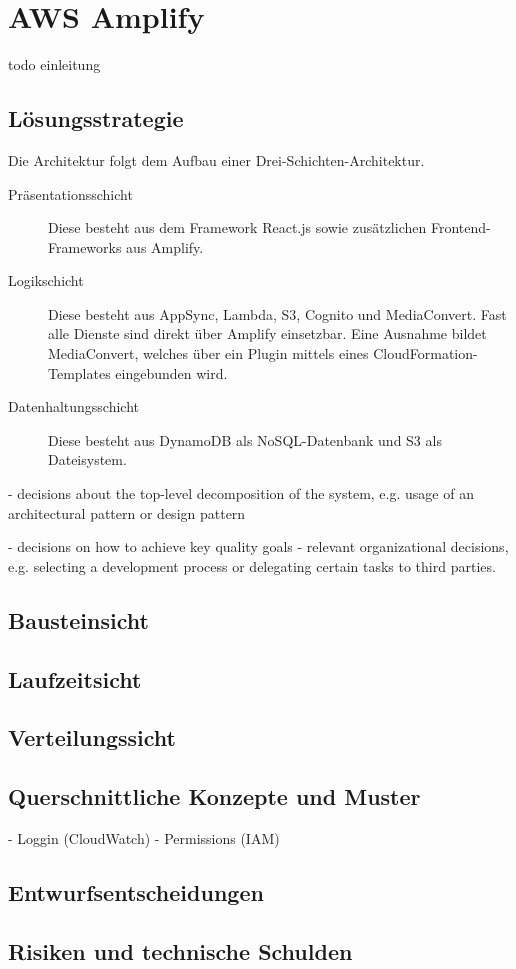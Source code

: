 \section{AWS Amplify}

todo einleitung

\subsection{Lösungsstrategie}

Die Architektur folgt dem Aufbau einer Drei-Schichten-Architektur.

\begin{description}
   \item[Präsentationsschicht] Diese besteht aus dem Framework React.js sowie zusätzlichen Frontend-Frameworks aus Amplify.
   \item[Logikschicht] Diese besteht aus AppSync, Lambda, S3, Cognito und MediaConvert. Fast alle Dienste sind direkt über Amplify einsetzbar. Eine Ausnahme bildet MediaConvert, welches über ein Plugin mittels eines CloudFormation-Templates eingebunden wird.
   \item[Datenhaltungsschicht] Diese besteht aus DynamoDB als NoSQL-Datenbank und S3 als Dateisystem.
\end{description}

- decisions about the top-level decomposition of the system, e.g. usage of an architectural pattern or design pattern


- decisions on how to achieve key quality goals
- relevant organizational decisions, e.g. selecting a development process or delegating certain tasks to third parties.

\subsection{Bausteinsicht}

\subsection{Laufzeitsicht}

\subsection{Verteilungssicht}

\subsection{Querschnittliche Konzepte und Muster}

- Loggin (CloudWatch)
- Permissions (IAM)

\subsection{Entwurfsentscheidungen}

\subsection{Risiken und technische Schulden}
